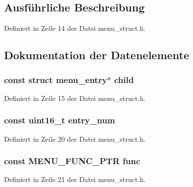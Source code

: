 \subsection{Ausführliche Beschreibung}


Definiert in Zeile 14 der Datei menu\+\_\+struct.\+h.



\subsection{Dokumentation der Datenelemente}
\hypertarget{structmenu__entry_afb8f7c977abd9b84c48a00c204aad77b}{}
\subsubsection[{child}]{\setlength{\rightskip}{0pt plus 5cm}const struct {\bf menu\+\_\+entry}$\ast$ child}\label{structmenu__entry_afb8f7c977abd9b84c48a00c204aad77b}


Definiert in Zeile 15 der Datei menu\+\_\+struct.\+h.

\hypertarget{structmenu__entry_aead51ebe631627145d52a84b2d92e240}{}
\subsubsection[{entry\+\_\+num}]{\setlength{\rightskip}{0pt plus 5cm}const uint16\+\_\+t entry\+\_\+num}\label{structmenu__entry_aead51ebe631627145d52a84b2d92e240}


Definiert in Zeile 20 der Datei menu\+\_\+struct.\+h.

\hypertarget{structmenu__entry_a365388f9c041d9cc19cb73e599ece1d6}{}
\subsubsection[{func}]{\setlength{\rightskip}{0pt plus 5cm}const {\bf M\+E\+N\+U\+\_\+\+F\+U\+N\+C\+\_\+\+P\+T\+R} func}\label{structmenu__entry_a365388f9c041d9cc19cb73e599ece1d6}


Definiert in Zeile 21 der Datei menu\+\_\+struct.\+h.

\hypertarget{structmenu__entry_a8667330bb5cb56772e88abd901064211}{}
